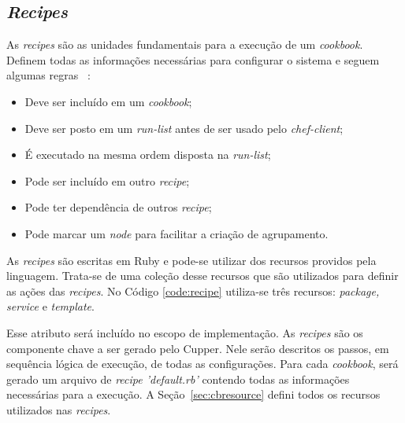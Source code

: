 
\subsection{\textit{Recipes}}
\label{sec:lev-rec-rec}

As \textit{recipes} são as unidades fundamentais para a execução de um \textit{cookbook}. Definem
todas as informações necessárias para configurar o sistema e seguem algumas regras
~\cite{chefdoc:2016}:

\begin{itemize}
  \item Deve ser incluído em um \textit{cookbook};
  \item Deve ser posto em um \textit{run-list} antes de ser usado pelo \textit{chef-client};
  \item É executado na mesma ordem disposta na \textit{run-list};
  \item Pode ser incluído em outro \textit{recipe};
  \item Pode ter dependência de outros \textit{recipe};
  \item Pode marcar um \textit{node} para facilitar a criação de agrupamento.
\end{itemize}

As \textit{recipes} são escritas em Ruby e pode-se utilizar dos recursos providos
pela linguagem. Trata-se de uma coleção desse recursos que são utilizados
para definir as ações das \textit{recipes}. No Código \ref{code:recipe} utiliza-se
três recursos: \textit{package, service} e \textit{template}.

\begin{minipage}{.90\textwidth}
  \lstset{style=shell}
  
\end{minipage}

Esse atributo será incluído no escopo de implementação. As \textit{recipes} são os componente chave a
ser gerado pelo Cupper. Nele serão descritos os passos, em sequência lógica de execução,
de todas as configurações. Para cada \textit{cookbook}, será gerado um arquivo de 
\textit{recipe 'default.rb'} contendo todas as informações necessárias para a execução.
A Seção~\ref{sec:cbresource} defini todos os recursos utilizados nas \textit{recipes}.
